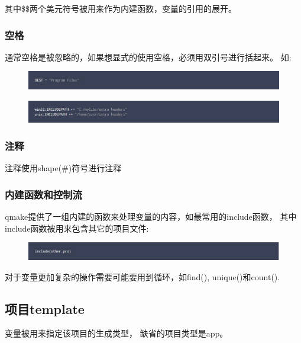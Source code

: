 其中\$\$两个美元符号被用来作为内建函数，变量的引用的展开。

\subsubsection{空格}
通常空格是被忽略的，如果想显式的使用空格，必须用双引号进行括起来。
如:
\begin{figure}[htbp]
  \centering
  \includegraphics[width=\textwidth]{qmake/images/whitespace1}
\end{figure}

\begin{figure}[htbp]
  \centering
  \includegraphics[width=\textwidth]{qmake/images/whitespace2}
\end{figure}

\subsubsection{注释}
注释使用shape(\#)符号进行注释

\subsubsection{内建函数和控制流}
qmake提供了一组内建的函数来处理变量的内容，如最常用的include函数，%
其中include函数被用来包含其它的项目文件:
\begin{figure}[htbp]
  \centering
  \includegraphics[width=\textwidth]{qmake/images/include}
\end{figure}

对于变量更加复杂的操作需要可能要用到循环，如find(), unique()和count().

\subsection{项目template}
变量{\color{seagreen}{TEMPLATE}}被用来指定该项目的生成类型，%
缺省的项目类型是app。%

